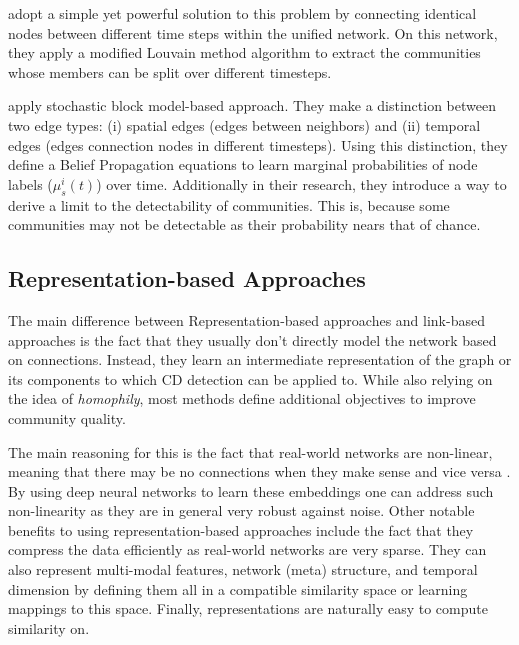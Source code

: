 \documentclass[
acmsmall,
nonacm,
screen,
acmthm]{../../scripts/pandoc/templates/acmart}
\begin{document}
\citet{muchaCommunityStructureTimeDependent2009} adopt a simple yet
powerful solution to this problem by connecting identical nodes between
different time steps within the unified network. On this network, they
apply a modified Louvain method algorithm to extract the communities
whose members can be split over different timesteps.

\citet{ghasemianDetectabilityThresholdsOptimal2016} apply stochastic
block model-based approach. They make a distinction between two edge
types: (i) spatial edges (edges between neighbors) and (ii) temporal
edges (edges connection nodes in different timesteps). Using this
distinction, they define a Belief Propagation equations to learn
marginal probabilities of node labels (\(\mu^i_s(t)\)) over time.
Additionally in their research, they introduce a way to derive a limit
to the detectability of communities. This is, because some communities
may not be detectable as their probability nears that of chance.

\hypertarget{representation-based-approaches}{%
\subsection{Representation-based
Approaches}\label{representation-based-approaches}}

The main difference between Representation-based approaches and
link-based approaches is the fact that they usually don't directly model
the network based on connections. Instead, they learn an intermediate
representation of the graph or its components to which CD detection can
be applied to. While also relying on the idea of \emph{homophily}, most
methods define additional objectives to improve community quality.

The main reasoning for this is the fact that real-world networks are
non-linear, meaning that there may be no connections when they make
sense and vice versa \citep{wangEvolutionaryAutoencoderDynamic2020}. By
using deep neural networks to learn these embeddings one can address
such non-linearity as they are in general very robust against noise.
Other notable benefits to using representation-based approaches include
the fact that they compress the data efficiently as real-world networks
are very sparse. They can also represent multi-modal features, network
(meta) structure, and temporal dimension by defining them all in a
compatible similarity space or learning mappings to this space. Finally,
representations are naturally easy to compute similarity on.
\end{document}
